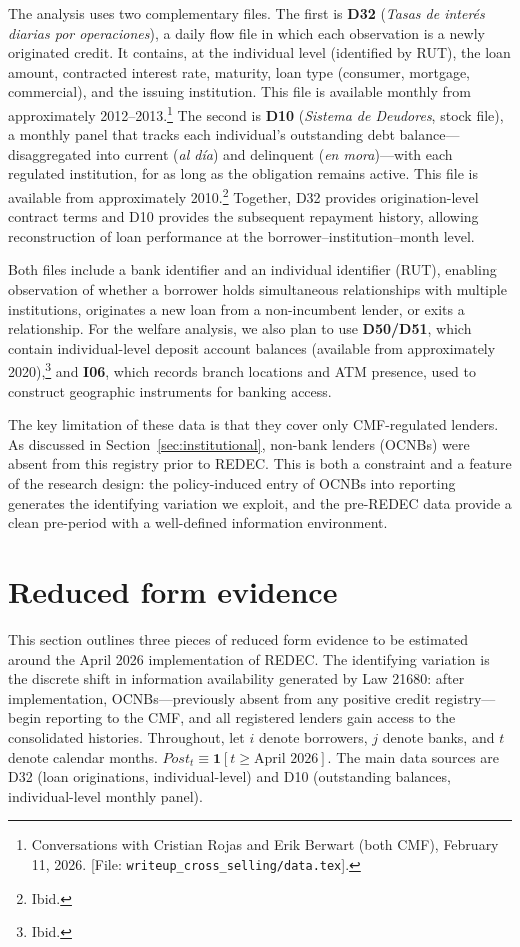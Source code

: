\documentclass[12pt]{article}
\theoremstyle{plain}
\theoremstyle{plain}
\begin{document}
The analysis uses two complementary files. The first is \textbf{D32} (\textit{Tasas de inter\'es diarias por operaciones}), a daily flow file in which each observation is a newly originated credit. It contains, at the individual level (identified by RUT), the loan amount, contracted interest rate, maturity, loan type (consumer, mortgage, commercial), and the issuing institution. This file is available monthly from approximately 2012--2013.\footnote{Conversations with Cristian Rojas and Erik Berwart (both CMF), February 11, 2026. [File: \texttt{writeup\_cross\_selling/data.tex}].} The second is \textbf{D10} (\textit{Sistema de Deudores}, stock file), a monthly panel that tracks each individual's outstanding debt balance—disaggregated into current (\textit{al d\'ia}) and delinquent (\textit{en mora})—with each regulated institution, for as long as the obligation remains active. This file is available from approximately 2010.\footnote{Ibid.} Together, D32 provides origination-level contract terms and D10 provides the subsequent repayment history, allowing reconstruction of loan performance at the borrower--institution--month level.

Both files include a bank identifier and an individual identifier (RUT), enabling observation of whether a borrower holds simultaneous relationships with multiple institutions, originates a new loan from a non-incumbent lender, or exits a relationship. For the welfare analysis, we also plan to use \textbf{D50/D51}, which contain individual-level deposit account balances (available from approximately 2020),\footnote{Ibid.} and \textbf{I06}, which records branch locations and ATM presence, used to construct geographic instruments for banking access.

The key limitation of these data is that they cover only CMF-regulated lenders. As discussed in Section~\ref{sec:institutional}, non-bank lenders (OCNBs) were absent from this registry prior to REDEC. This is both a constraint and a feature of the research design: the policy-induced entry of OCNBs into reporting generates the identifying variation we exploit, and the pre-REDEC data provide a clean pre-period with a well-defined information environment.

\section{Reduced form evidence}

This section outlines three pieces of reduced form evidence to be estimated around the April 2026 implementation of REDEC. The identifying variation is the discrete shift in information availability generated by Law 21680: after implementation, OCNBs—previously absent from any positive credit registry—begin reporting to the CMF, and all registered lenders gain access to the consolidated histories. Throughout, let $i$ denote borrowers, $j$ denote banks, and $t$ denote calendar months. $Post_t \equiv \mathbf{1}[t \geq \text{April 2026}]$. The main data sources are D32 (loan originations, individual-level) and D10 (outstanding balances, individual-level monthly panel).
\end{document}
